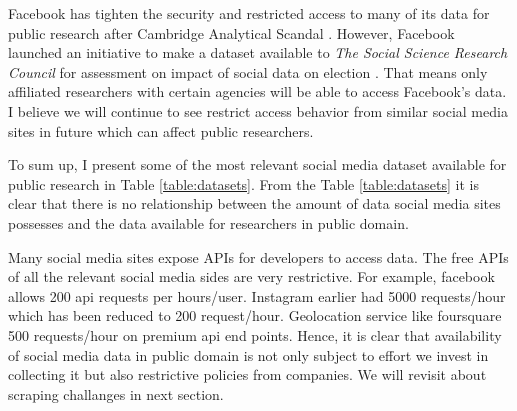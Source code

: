 Facebook has tighten the security and restricted access to many of its data for public research after Cambridge Analytical Scandal \cite{cambridge_analytica, fb_data}. However, Facebook launched an initiative to make a dataset available to {\em The Social Science Research Council} for assessment on impact of social data on election \cite{fb_initiative}. That means only affiliated researchers with certain agencies will be able to access Facebook's data. I believe we will continue to see restrict access behavior from similar social media sites in future which can affect public researchers.

To sum up, I present some of the most relevant social media dataset available for public research in Table \ref{table:datasets}. From the Table \ref{table:datasets} it is clear that there is no relationship between the amount of data social media sites possesses and the data available for researchers in public domain.

Many social media sites expose APIs for developers to access data. The free APIs of all the relevant social media sides are very restrictive. For example, facebook allows 200 api requests per hours/user. Instagram earlier had 5000 requests/hour which has been reduced to 200 request/hour. Geolocation service like foursquare 500 requests/hour on premium api end points. Hence, it is clear that availability of social media data in public domain is not only subject to effort we invest in collecting it but also restrictive policies from companies. We will revisit about scraping challanges in next section.

